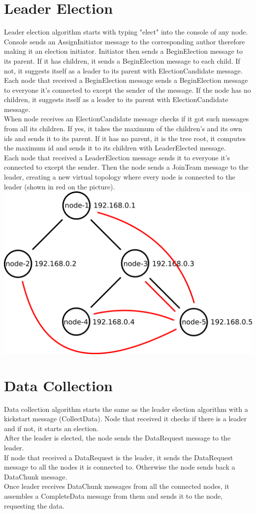 \documentclass{article}
\begin{document}
\section{Leader Election}
Leader election algorithm starts with typing "elect" into the console of any node. Console sends an AssignInitiator message to the corresponding author therefore making it an election initiator. Initiator then sends a BeginElection message to its parent. If it has children, it sends a BeginElection message to each child. If not, it suggests itself as a leader to its parent with ElectionCandidate message.
Each node that received a BeginElection message sends a BeginElection message to everyone it's connected to except the sender of the message. If the node has no children, it suggests itself as a leader to its parent with ElectionCandidate message.\\
When node receives an ElectionCandidate message checks if it got such messages from all its children. If yes, it takes the maximum of the children's and its own ids and sends it to its parent. If it has no parent, it is the tree root, it computes the maximum id and sends it to its children with LeaderElected message.\\
Each node that received a LeaderElection message sends it to everyone it's connected to except the sender. Then the node sends a JoinTeam message to the leader, creating a new virtual topology where every node is connected to the leader (shown in red on the picture).\\
\includegraphics[width=\textwidth]{topology2.png}
\section{Data Collection}
Data collection algorithm starts the same as the leader election algorithm with a kickstart message (CollectData). Node that received it checks if there is a leader and if not, it starts an election.\\
After the leader is elected, the node sends the DataRequest message to the leader.\\
If node that received a DataRequest is the leader, it sends the DataRequest message to all the nodes it is connected to. Otherwise the node sends back a DataChunk message.\\
Once leader receives DataChunk messages from all the connected nodes, it assembles a CompleteData message from them and sends it to the node, requesting the data.
\end{document}
